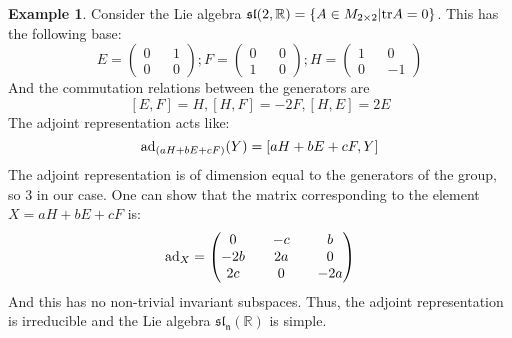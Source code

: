 \documentclass[12pt,a4paper]{report}
\theoremstyle{definition}
\theoremstyle{Theorem}
\theoremstyle{definition}
\newtheorem{Ex}[Def]{Example}
\theoremstyle{definition}
\begin{document}
	\begin{Ex}
		Consider the Lie algebra $\mathfrak{sl}(2,\mathbb{R})=\{A\in M_{2\times 2}|\hbox{tr} A=0\}$. This has the following base:
		$$E=
		\begin{pmatrix}
			0 && 1\\
			0 && 0
		\end{pmatrix};
		F=
		\begin{pmatrix}
			0 && 0\\
			1 && 0
		\end{pmatrix};
		H=
		\begin{pmatrix}
			1 && 0\\
			0 && -1
		\end{pmatrix}$$
		And the commutation relations between the generators are 
		$$[E,F]=H, [H,F]=-2F,[H,E]=2E$$
		The adjoint representation acts like:
		$$\hbox{ad}_{(aH+bE+cF)}(Y)=[aH+bE+cF,Y]$$
		The adjoint representation is of dimension equal to the generators of the group, so 3 in our case. One can show that the matrix corresponding to the element $X=aH+bE+cF$ is:
		$$\hbox{ad}_X=
		\begin{pmatrix}
			0 && -c && b \\
			-2b && 2a && 0 \\
			2c && 0 && -2a \\
		\end{pmatrix}$$
		And this has no non-trivial invariant subspaces. Thus, the adjoint representation is irreducible and the Lie algebra $\mathfrak{sl_n}(\mathbb{R})$ is simple.
	\end{Ex}
\end{document}
